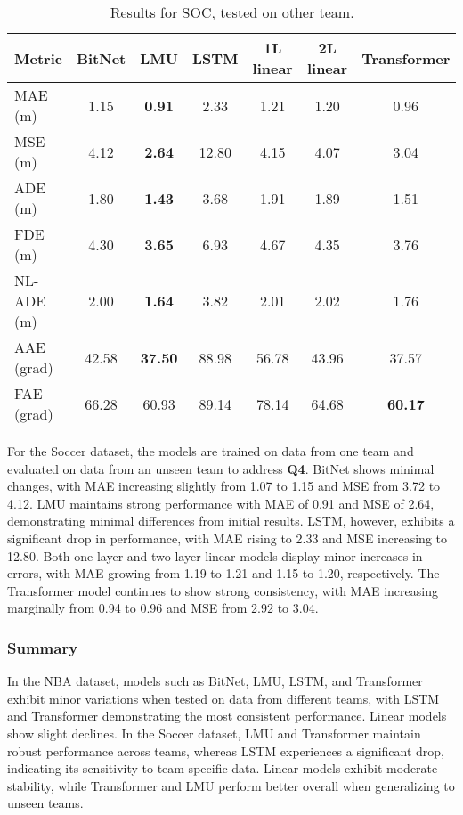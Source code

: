 \begin{table}[H]
\centering
\caption{Results for SOC, tested on other team.}
\label{other_team:SOC}
\begin{tabular}{l||c|c|c|c|c|c}
Metric & BitNet & LMU & LSTM & 1L linear & 2L linear & Transformer \\
\hline\hline
MAE (m) & 1.15 & \textbf{0.91} & 2.33 & 1.21 & 1.20 & 0.96 \\
MSE (m) & 4.12 & \textbf{2.64} & 12.80 & 4.15 & 4.07 & 3.04 \\
ADE (m) & 1.80 & \textbf{1.43} & 3.68 & 1.91 & 1.89 & 1.51 \\
FDE (m) & 4.30 & \textbf{3.65} & 6.93 & 4.67 & 4.35 & 3.76 \\
NL-ADE (m) & 2.00 & \textbf{1.64} & 3.82 & 2.01 & 2.02 & 1.76 \\
AAE (grad) & 42.58 & \textbf{37.50} & 88.98 & 56.78 & 43.96 & 37.57 \\
FAE (grad) & 66.28 & 60.93 & 89.14 & 78.14 & 64.68 & \textbf{60.17} \\
\end{tabular}
\end{table}

For the Soccer dataset, the models are trained on data from one team and evaluated on data from an unseen team to address \textbf{Q4}. BitNet shows minimal changes, with MAE increasing slightly from 1.07 to 1.15 and MSE from 3.72 to 4.12. LMU maintains strong performance with MAE of 0.91 and MSE of 2.64, demonstrating minimal differences from initial results. LSTM, however, exhibits a significant drop in performance, with MAE rising to 2.33 and MSE increasing to 12.80. Both one-layer and two-layer linear models display minor increases in errors, with MAE growing from 1.19 to 1.21 and 1.15 to 1.20, respectively. The Transformer model continues to show strong consistency, with MAE increasing marginally from 0.94 to 0.96 and MSE from 2.92 to 3.04.

\subsubsection{Summary}
In the NBA dataset, models such as BitNet, LMU, LSTM, and Transformer exhibit minor variations when tested on data from different teams, with LSTM and Transformer demonstrating the most consistent performance. Linear models show slight declines. In the Soccer dataset, LMU and Transformer maintain robust performance across teams, whereas LSTM experiences a significant drop, indicating its sensitivity to team-specific data. Linear models exhibit moderate stability, while Transformer and LMU perform better overall when generalizing to unseen teams.

